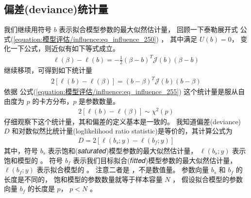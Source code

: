\documentclass[letterpaper,10pt,english]{sphinxmanual}
\begin{document}
\subsection{偏差(deviance)统计量}
\label{\detokenize{_u6a21_u578b_u8bc4_u4f30/influence:deviance}}\label{\detokenize{_u6a21_u578b_u8bc4_u4f30/influence:ch-influence-deviance}}
我们继续用符号 \(b\) 表示拟合模型参数的最大似然估计量，
回顾一下泰勒展开式 公式(\ref{equation:模型评估/influence:eq_influence_250}) ，
其中满足 \(U(b)=0\)，
变化一下公式，则近似有如下等式成立。
\begin{equation}\label{equation:模型评估/influence:模型评估/influence:30}
\begin{split}\ell(\beta) - \ell(b) = -\frac{1}{2}(\beta -b)^T\mathcal{J}(b)(\beta-b)\end{split}
\end{equation}
继续移项，可得到如下统计量
\begin{equation}\label{equation:模型评估/influence:eq_influence_260}
\begin{split}2[\ell(b) - \ell(\beta) ] = (b-\beta )^T\mathcal{J}(b)(b-\beta)\end{split}
\end{equation}
依据 公式(\ref{equation:模型评估/influence:eq_influence_255}) 这个统计量是服从自由度为 \(p\) 的卡方分布，\(p\)
是参数数量。
\begin{equation}\label{equation:模型评估/influence:模型评估/influence:31}
\begin{split}2[\ell(b) - \ell(\beta) ] \sim \chi^2(p)\end{split}
\end{equation}
仔细观察下这个统计量，其和偏差的定义基本是一致的。
我知道偏差(deviance) \(D\)
和对数似然比统计量(log\sphinxhyphen{}likelihood ratio statistic)是等价的，其计算公式为
\begin{equation}\label{equation:模型评估/influence:模型评估/influence:32}
\begin{split}D = 2[\ell(b_{s};y) - \ell(b_{f};y)]\end{split}
\end{equation}
其中，符号 \(b_{s}\) 表示饱和(𝑠𝑎𝑡𝑢𝑟𝑎𝑡𝑒𝑑)模型参数的最大似然估计量，
\(\ell(b_{s};y)\) 表示饱和模型的 。
符号 \(b_{f}\) 表示我们目标拟合(𝑓𝑖𝑡𝑡𝑒𝑑)模型参数的最大似然估计量，
\(\ell(b_{f};y)\) 表示拟合模型的  。
注意二者是 ，不是数值量。
参数向量 \(b_{s}\) 和 \(b_{f}\) 的长度是不同的，
饱和模型的参数数量就等于样本容量 \(N\) ，
假设拟合模型的参数向量 \(b_{f}\) 的长度是 \(p\)， \(p<N\)  。
\end{document}
